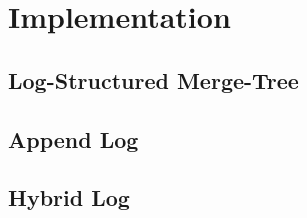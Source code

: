 
\chapter{Implementation}

\label{Chapter3-implementation}

\section{Log-Structured Merge-Tree}





\section{Append Log}



\section{Hybrid Log}

